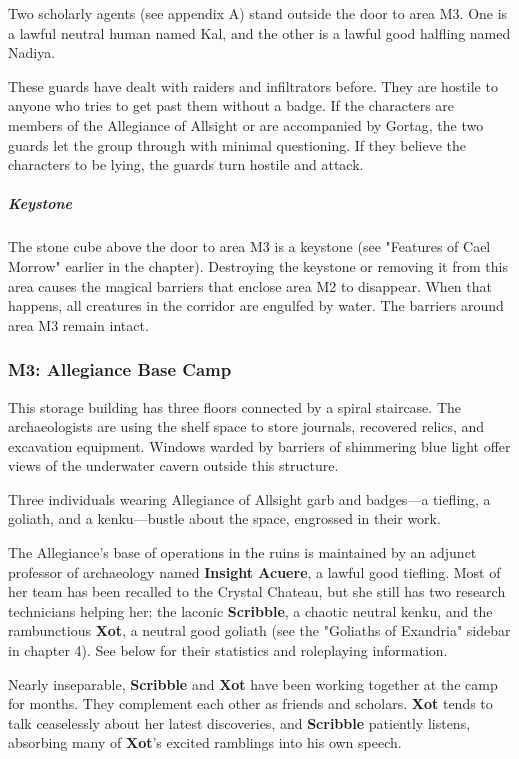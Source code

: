 \documentclass[10pt,a4paper,twoside,bg=print,twocolumn,openany,nodeprecatedcode]{dndbook}
\begin{document}
Two scholarly agents (see appendix A) stand outside the door to area M3. One is a lawful neutral human named Kal, and the other is a lawful good halfling named Nadiya.

These guards have dealt with raiders and infiltrators before. They are hostile to anyone who tries to get past them without a badge. If the characters are members of the Allegiance of Allsight or are accompanied by Gortag, the two guards let the group through with minimal questioning. If they believe the characters to be lying, the guards turn hostile and attack.

\subparagraph{Keystone}
The stone cube above the door to area M3 is a keystone (see "Features of Cael Morrow" earlier in the chapter). Destroying the keystone or removing it from this area causes the magical barriers that enclose area M2 to disappear. When that happens, all creatures in the corridor are engulfed by water. The barriers around area M3 remain intact.

\subsubsection{M3: Allegiance Base Camp}
\begin{DndReadAloud}{}
This storage building has three floors connected by a spiral staircase. The archaeologists are using the shelf space to store journals, recovered relics, and excavation equipment. Windows warded by barriers of shimmering blue light offer views of the underwater cavern outside this structure.

Three individuals wearing Allegiance of Allsight garb and badges—a tiefling, a goliath, and a kenku—bustle about the space, engrossed in their work.

\end{DndReadAloud}

The Allegiance's base of operations in the ruins is maintained by an adjunct professor of archaeology named \textbf{Insight Acuere}, a lawful good tiefling. Most of her team has been recalled to the Crystal Chateau, but she still has two research technicians helping her: the laconic \textbf{Scribble}, a chaotic neutral kenku, and the rambunctious \textbf{Xot}, a neutral good goliath (see the "Goliaths of Exandria" sidebar in chapter 4). See below for their statistics and roleplaying information.

Nearly inseparable, \textbf{Scribble} and \textbf{Xot} have been working together at the camp for months. They complement each other as friends and scholars. \textbf{Xot} tends to talk ceaselessly about her latest discoveries, and \textbf{Scribble} patiently listens, absorbing many of \textbf{Xot}'s excited ramblings into his own speech.
\end{document}
